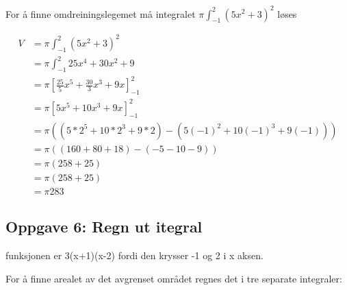 \documentclass{article}
\begin{document}
For å finne omdreiningslegemet må integralet $\pi \int_{-1}^{2} (5x^2+3)^2$ løses

\begin{align*}
    V &= \pi \int_{-1}^{2} (5x^2+3)^2 \\
    &= \pi \int_{-1}^{2} 25x^4 + 30x^2 + 9 \\
    &= \pi [\frac{25}{5} x^5 + \frac{30}{3} x^3 + 9x]^2_{-1} \\
    &= \pi [5x^5 + 10 x^3 + 9x]^2_{-1} \\
    &= \pi ((5 * 2^5 + 10*2^3 + 9*2) - (5(-1)^2 + 10(-1)^3 + 9(-1))) \\
    &= \pi ((160 + 80 + 18) - (-5-10-9)) \\
    &= \pi (258 + 25) \\ 
    &= \pi (258 + 25) \\
    &= \pi 283
\end{align*}

\subsection{Oppgave 6: Regn ut itegral}

funksjonen er 3(x+1)(x-2) fordi den krysser -1 og 2 i x aksen.

For å finne arealet av det avgrenset området regnes det i tre separate integraler:
\end{document}
